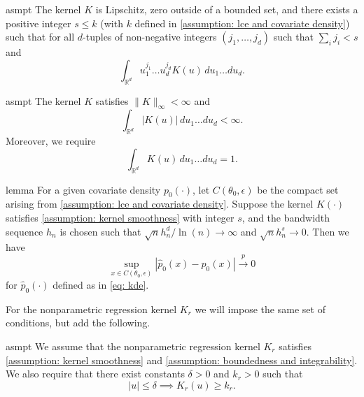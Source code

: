 \documentclass[11pt]{article}
\begin{document}
\begin{restatable}{asmpt}{} \label{assumption: kernel smoothness}
    The kernel $K$ is Lipschitz, zero outside of a bounded set, and there exists a positive integer $s \leq k$ (with $k$ defined in \cref{assumption: lce and covariate density}) such that for all $d$-tuples of non-negative integers $(j_1, \dots, j_d)$ such that $\sum_i j_i < s$ and
    \[\int_{\mathbb{R}^d}u_1^{j_1}\dots u_d^{j_d}K(u)\,du_1\dots du_d.\]
\end{restatable}

\begin{restatable}{asmpt}{} \label{assumption: boundedness and integrability}
    The kernel $K$ satisfies $\|K\|_{\infty} < \infty$ and 
    \[\int_{\mathbb{R}^d}|K(u)|\,du_1\dots du_d < \infty.\]
    Moreover, we require
    \[\int_{\mathbb{R}^d}K(u)\,du_1\dots du_d =  1.\]
\end{restatable}

\begin{restatable}{lemma}{} \label{lemma: uniform convergence of kde}
    For a given covariate density $p_0(\cdot)$, let $C(\theta_0, \epsilon)$ be the compact set arising from \cref{assumption: lce and covariate density}. Suppose the kernel $K(\cdot)$ satisfies \cref{assumption: kernel smoothness} with integer $s$, and the bandwidth sequence $h_n$ is chosen such that $\sqrt{n}h_n^d/\ln(n) \rightarrow \infty$ and $\sqrt{n}h_n^s \rightarrow 0$. Then we have
    \begin{equation}
        \sup_{x \in C(\theta_0, \epsilon)} \left|\hat{p}_0(x) - p_0(x)\right| \overset{p}{\rightarrow} 0
    \end{equation}
    for $\hat{p}_0(\cdot)$ defined as in \cref{eq: kde}.
\end{restatable}

For the nonparametric regression kernel $K_r$ we will impose the same set of conditions, but add the following. 

\begin{restatable}{asmpt}{} \label{assumption: kernel nondegeneracy}
    We assume that the nonparametric regression kernel $K_r$ satisfies \cref{assumption: kernel smoothness} and \cref{assumption: boundedness and integrability}. We also require that there exist constants $\delta > 0$ and $k_r > 0$ such that 
    \[|u| \leq \delta \implies K_r(u) \geq k_r.\]
\end{restatable}
\end{document}
